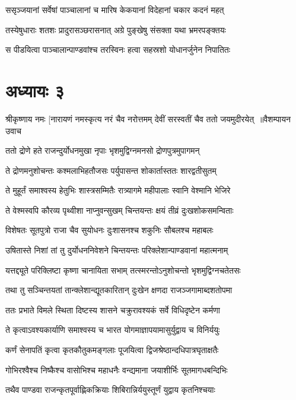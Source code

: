 \twolineshloka
{ससृञ्जयानां सर्वेषां पाञ्चालानां च मारिष}
{केकयानां विदेहानां चकार कदनं महत्}


\twolineshloka
{तस्येषुधाराः शतशः प्रादुरासञ्छरासनात्}
{अग्रे पुङ्खेषु संसक्ता यथा भ्रमरपङ्क्तयः}


\twolineshloka
{स पीडयित्वा पाञ्चालान्पाण्डवांश्च तरस्विनः}
{हत्वा सहस्रशो योधानर्जुनेन निपातितः}


\chapter{अध्यायः ३}
श्रीकृष्णाय नमः
\threelineshloka
{[नारायणं नमस्कृत्य नरं चैव नरोत्तमम्}
{देवीं सरस्वतीं चैव ततो जयमुदीरयेत् ॥वैशम्पायन उवाच}
{}


\twolineshloka
{ततो द्रोणे हते राजन्दुर्योधनमुखा नृपाः}
{भृशमुद्विग्नमनसो द्रोणपुत्रमुपागमन्}


\twolineshloka
{ते द्रोणमनुशोचन्तः कश्मलाभिहतौजसः}
{पर्युपासन्त शोकार्तास्ततः शारद्वतीसुतम्}


\twolineshloka
{ते मुहूर्तं समाश्वस्य हेतुभिः शास्त्रसम्मितैः}
{रात्र्यागमे महीपालाः स्वानि वेश्मानि भेजिरे}


\twolineshloka
{ते वेश्मस्वपि कौरव्य पृथ्वीशा नाप्नुवन्सुखम्}
{चिन्तयन्तः क्षयं तीव्रं दुःखशोकसमन्विताः}


\twolineshloka
{विशेषतः सूतपुत्रो राजा चैव सुयोधनः}
{दुःशासनश्च शकुनिः सौबलश्च महाबलः}


\twolineshloka
{उषितास्ते निशां तां तु दुर्योधननिवेशने}
{चिन्तयन्तः परिक्लेशान्पाण्डवानां महात्मनाम्}


\twolineshloka
{यत्तद्द्यूते परिक्लिष्टा कृष्णा चानायिता सभाम्}
{तत्स्मरन्तोऽनुशोचन्तो भृशमुद्विग्नचतेतसः}


\twolineshloka
{तथा तु सञ्चिन्तयतां तान्क्लेशान्द्यूतकारितान्}
{दुःखेन क्षणदा राजञ्जगामाब्दशतोपमा}


\twolineshloka
{ततः प्रभाते विमले स्थिता दिष्टस्य शासने}
{चक्रुरावश्यकं सर्वे विधिदृष्टेन कर्मणा}


\twolineshloka
{ते कृत्वाऽवश्यकार्याणि समाश्वस्य च भारत}
{योगमाज्ञापयामासुर्युद्वाय च विनिर्ययुः}


\twolineshloka
{कर्णं सेनापतिं कृत्वा कृतकौतुकमङ्गलाः}
{पूजयित्वा द्विजश्रेष्ठान्दधिपात्रघृताक्षतैः}


\twolineshloka
{गोभिरश्वैश्च निष्कैश्च वासोभिश्च महाधनैः}
{वन्द्यमाना जयाशीर्भिः सूतमागधबन्दिभिः}


\twolineshloka
{तथैव पाण्डवा राजन्कृतपूर्वाह्णिकक्रियाः}
{शिबिरान्निर्ययुस्तूर्णं युद्वाय कृतनिश्चयाः}


